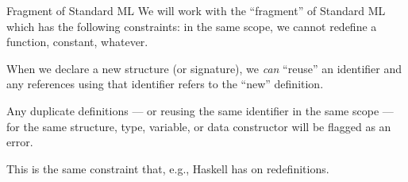 \begin{deviation}{Fragment of Standard ML}\label{deviation:no-redefinitions}
We will work with the ``fragment'' of Standard ML which has the
following constraints: in the same scope, we cannot redefine a function,
constant, whatever.

When we declare a new structure (or signature), we \emph{can} ``reuse''
an identifier and any references using that identifier refers to the
``new'' definition.

Any duplicate definitions --- or reusing the same identifier in the same
scope --- for the same structure, type, variable, or data constructor
will be flagged as an error.

This is the same constraint that, e.g., Haskell has on redefinitions.
\end{deviation}

\begin{comment}{Basic judgements in the Definition}
  In the preface to the 1997
  Definition~\cite[pp.xi-xii]{milner1997definition}, the authors explain
  in the preface: 
  \begin{quotation}
    We shall now explain the keystone of our semantic method. First, we
    need a slight but important refinement. A phrase $P$ is never evaluated
    \textit{in vacuo} to a meaning $M$, but always against a background;
    this background --- call it $B$ --- is itself a semantic object,
    being a distillation of the meanings preserved from evaluation of
    earlier phrases (typically variable declarations, procedure
    declarations, etc.). In fact evaluation is background-dependent ---
    $M$ depends upon $B$ as well as upon $P$.

    The keystone of the method, then, is a certain kind of assertion about
    evaluation; it takes the form
    \begin{equation*}
B\vdash P\Rightarrow M
    \end{equation*}
    and may be pronounced: ``Against the background $B$, the phrase $P$
    evaluates to the meaning $M$''. \emph{The formal purpose of this
    Definition is no more, and no less, than to decree exactly which
    assertions of this form are true}. This could be achieved in many
    ways. We have chosen to do it in a structured way, as others have,
    by giving rules which allow assertions about a \emph{compound} phrase $P$
    to be inferred from assertions about its \emph{constituent} phrases
    $P_{1}$, \dots, $P_{n}$.
  \end{quotation}
  Unfortunately, programming language semantics evolved beyond this, and
  this approach seems archaic.
\end{comment}

